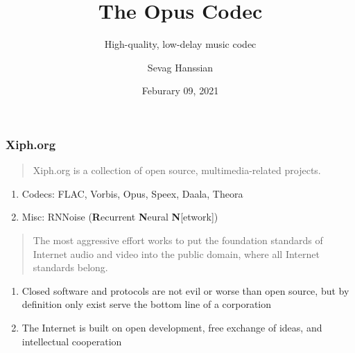 \documentclass{beamer}
\title{The Opus Codec}
\subtitle{High-quality, low-delay music codec}
\author{Sevag Hanssian}
\date{Feburary 09, 2021}
\institute{MUMT 621, Winter 2021}
\begin{document}
\begin{frame}
\maketitle
\end{frame}

\begin{frame}
	\frametitle{Xiph.org}
	\begin{quote}
		Xiph.org is a collection of open source, multimedia-related projects.
	\end{quote}
	\begin{enumerate}
			\vspace{-0.5em}
		\item
			Codecs: FLAC, Vorbis, Opus, Speex, Daala, Theora
		\item
			Misc: RNNoise (\textbf{R}ecurrent \textbf{N}eural \textbf{N}[etwork])
	\end{enumerate}
	\vspace{1em}
	\begin{quote}
		The most aggressive effort works to put the foundation standards of Internet audio and video into the public domain, where all Internet standards belong.
	\end{quote}
	\begin{enumerate}
			\vspace{-0.5em}
		\item
			Closed software and protocols are not evil or worse than open source, but by definition only exist serve the bottom line of a corporation
		\item
			 The Internet is built on open development, free exchange of ideas, and intellectual cooperation
	\end{enumerate}
\end{frame}

\end{document}
